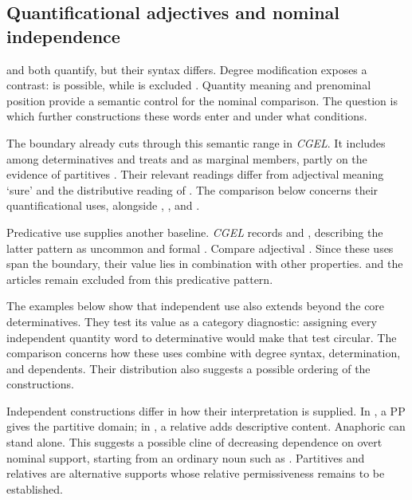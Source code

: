 \documentclass[12pt]{article}
\begin{document}
\subsection{Quantificational adjectives and nominal independence}\label{sec:quant-controls}

 and  both quantify, but their syntax differs. Degree modification exposes a contrast:  is possible, while  is excluded \citep[539--540]{huddleston2002}. Quantity meaning and prenominal position provide a semantic control for the nominal comparison. The question is which further constructions these words enter and under what conditions.

The boundary already cuts through this semantic range in \textit{CGEL}. It includes  among determinatives and treats  and  as marginal members, partly on the evidence of partitives \citep[392--393]{huddleston2002}. Their relevant readings differ from adjectival  meaning ‘sure’ and the distributive reading of . The comparison below concerns their quantificational uses, alongside , , and .

Predicative use supplies another baseline. \textit{CGEL} records  and , describing the latter pattern as uncommon and formal \citep[392, 395--396]{huddleston2002}. Compare adjectival . Since these uses span the boundary, their value lies in combination with other properties.  and the articles remain excluded from this predicative pattern.

The examples below show that independent use also extends beyond the core determinatives. They test its value as a category diagnostic: assigning every independent quantity word to determinative would make that test circular. The comparison concerns how these uses combine with degree syntax, determination, and dependents. Their distribution also suggests a possible ordering of the constructions.

Independent constructions differ in how their interpretation is supplied. In , a PP gives the partitive domain; in , a relative adds descriptive content. Anaphoric  can stand alone. This suggests a possible cline of decreasing dependence on overt nominal support, starting from an ordinary noun such as . Partitives and relatives are alternative supports whose relative permissiveness remains to be established.
\end{document}
